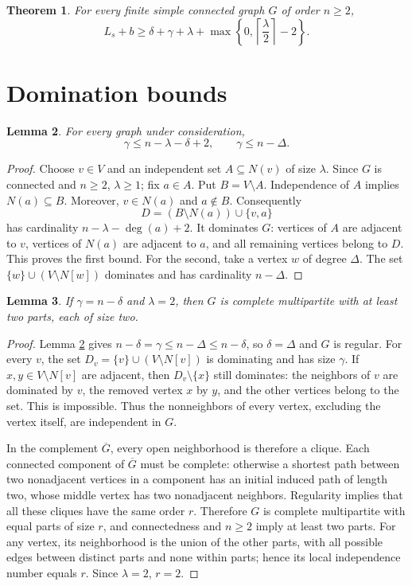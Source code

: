 \documentclass[11pt,a4paper]{article}
\newtheorem{theorem}{Theorem}
\newtheorem{lemma}[theorem]{Lemma}
\newcommand{\ls}{L_s}
\newcommand{\lam}{\lambda}
\begin{document}
\begin{theorem}\label{main}
For every finite simple connected graph $G$ of order $n\ge2$,
\[
\ls+b\ge\delta+\gamma+\lam+
\max\left\{0,\left\lceil\frac{\lam}{2}\right\rceil-2\right\}.
\]
\end{theorem}

\section{Domination bounds}
\begin{lemma}\label{dom}
For every graph under consideration,
\[
\gamma\le n-\lam-\delta+2,\qquad
\gamma\le n-\Delta.
\]
\end{lemma}
\begin{proof}
Choose $v\in V$ and an independent set $A\subseteq N(v)$ of size $\lam$. Since $G$ is connected and $n\ge2$, $\lam\ge1$; fix $a\in A$. Put $B=V\setminus A$. Independence of $A$ implies $N(a)\subseteq B$. Moreover, $v\in N(a)$ and $a\notin B$. Consequently
\[
D=(B\setminus N(a))\cup\{v,a\}
\]
has cardinality $n-\lam-\deg(a)+2$. It dominates $G$: vertices of $A$ are adjacent to $v$, vertices of $N(a)$ are adjacent to $a$, and all remaining vertices belong to $D$. This proves the first bound. For the second, take a vertex $w$ of degree $\Delta$. The set $\{w\}\cup(V\setminus N[w])$ dominates and has cardinality $n-\Delta$.
\end{proof}

\begin{lemma}\label{exception}
If $\gamma=n-\delta$ and $\lam=2$, then $G$ is complete multipartite with at least two parts, each of size two.
\end{lemma}
\begin{proof}
Lemma \ref{dom} gives $n-\delta=\gamma\le n-\Delta\le n-\delta$, so $\delta=\Delta$ and $G$ is regular. For every $v$, the set $D_v=\{v\}\cup(V\setminus N[v])$ is dominating and has size $\gamma$. If $x,y\in V\setminus N[v]$ are adjacent, then $D_v\setminus\{x\}$ still dominates: the neighbors of $v$ are dominated by $v$, the removed vertex $x$ by $y$, and the other vertices belong to the set. This is impossible. Thus the nonneighbors of every vertex, excluding the vertex itself, are independent in $G$.

In the complement $\overline G$, every open neighborhood is therefore a clique. Each connected component of $\overline G$ must be complete: otherwise a shortest path between two nonadjacent vertices in a component has an initial induced path of length two, whose middle vertex has two nonadjacent neighbors. Regularity implies that all these cliques have the same order $r$. Therefore $G$ is complete multipartite with equal parts of size $r$, and connectedness and $n\ge2$ imply at least two parts. For any vertex, its neighborhood is the union of the other parts, with all possible edges between distinct parts and none within parts; hence its local independence number equals $r$. Since $\lam=2$, $r=2$.
\end{proof}
\end{document}
